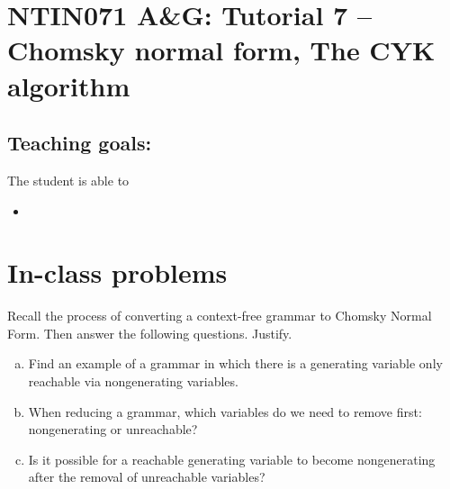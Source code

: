 \documentclass[a4paper,12pt]{amsart}
\begin{document}
\thispagestyle{empty}

\section*{NTIN071 A\&G: Tutorial 7 -- Chomsky normal form, The CYK algorithm}

\medskip

\subsection*{Teaching goals:} The student is able to

    \begin{itemize}\setlength{\itemsep}{0pt}
        \item 
    \end{itemize}


\section*{In-class problems}


\medskip\begin{problem}
    
    Recall the process of converting a context-free grammar to Chomsky Normal Form. Then answer the following questions. Justify.
    
    \begin{enumerate}[(a)]\setlength{\itemsep}{6pt}
        \item Find an example of a grammar in which there is a generating variable only reachable via nongenerating variables.
        \item When reducing a grammar, which variables do we need to remove first: nongenerating or unreachable?
        \item Is it possible for a reachable generating variable to become nongenerating after the removal of unreachable variables?
    \end{enumerate}

\end{problem}
\end{document}
